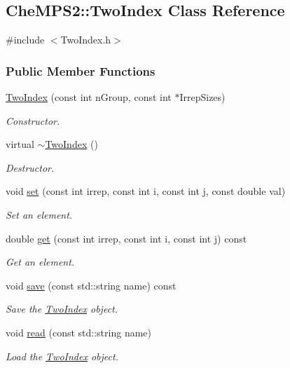 \hypertarget{classCheMPS2_1_1TwoIndex}{\subsection{Che\-M\-P\-S2\-:\-:Two\-Index Class Reference}
\label{classCheMPS2_1_1TwoIndex}
}


{\ttfamily \#include $<$Two\-Index.\-h$>$}

\subsubsection*{Public Member Functions}
\begin{DoxyCompactItemize}
\item 
\hyperlink{classCheMPS2_1_1TwoIndex_a6f6c5a45f2522d4adfc4f51d161ef680}{Two\-Index} (const int n\-Group, const int $\ast$Irrep\-Sizes)
\begin{DoxyCompactList}\small\item\em Constructor. \end{DoxyCompactList}\item 
\hypertarget{classCheMPS2_1_1TwoIndex_afcc065077cfa14cfecc9a325f39e4649}{virtual \hyperlink{classCheMPS2_1_1TwoIndex_afcc065077cfa14cfecc9a325f39e4649}{$\sim$\-Two\-Index} ()}\label{classCheMPS2_1_1TwoIndex_afcc065077cfa14cfecc9a325f39e4649}

\begin{DoxyCompactList}\small\item\em Destructor. \end{DoxyCompactList}\item 
void \hyperlink{classCheMPS2_1_1TwoIndex_a4385881853e910bb1ce7d5ea911b75c4}{set} (const int irrep, const int i, const int j, const double val)
\begin{DoxyCompactList}\small\item\em Set an element. \end{DoxyCompactList}\item 
double \hyperlink{classCheMPS2_1_1TwoIndex_a49c7065a18ca6b82e7a63a56cdf2687c}{get} (const int irrep, const int i, const int j) const 
\begin{DoxyCompactList}\small\item\em Get an element. \end{DoxyCompactList}\item 
void \hyperlink{classCheMPS2_1_1TwoIndex_a8e9f890d5af1091e10d09f43da11de12}{save} (const std\-::string name) const 
\begin{DoxyCompactList}\small\item\em Save the \hyperlink{classCheMPS2_1_1TwoIndex}{Two\-Index} object. \end{DoxyCompactList}\item 
void \hyperlink{classCheMPS2_1_1TwoIndex_a56586b601fa0b79fd6ab93c1a01d9705}{read} (const std\-::string name)
\begin{DoxyCompactList}\small\item\em Load the \hyperlink{classCheMPS2_1_1TwoIndex}{Two\-Index} object. \end{DoxyCompactList}\end{DoxyCompactItemize}


